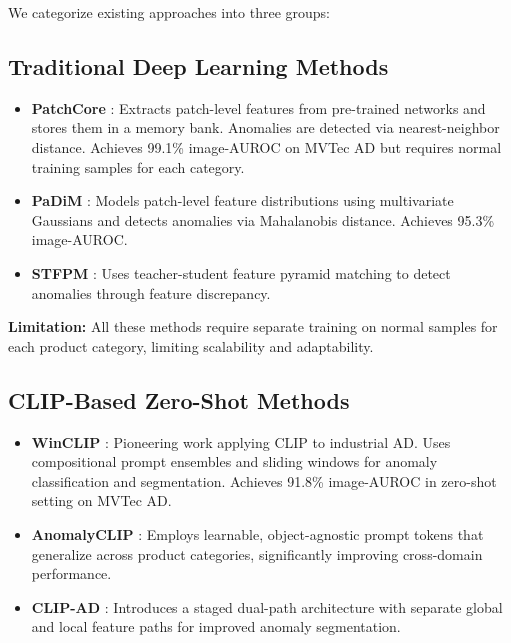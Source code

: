 \documentclass[12pt, a4paper]{article}
\begin{document}
We categorize existing approaches into three groups:

\subsection{Traditional Deep Learning Methods}

\begin{itemize}[leftmargin=*]
    \item \textbf{PatchCore} \cite{roth2022patchcore}: Extracts patch-level features from pre-trained networks and stores them in a memory bank. Anomalies are detected via nearest-neighbor distance. Achieves 99.1\% image-AUROC on MVTec AD but requires normal training samples for each category.
    
    \item \textbf{PaDiM} \cite{defard2020padim}: Models patch-level feature distributions using multivariate Gaussians and detects anomalies via Mahalanobis distance. Achieves 95.3\% image-AUROC.
    
    \item \textbf{STFPM} \cite{wang2021stfpm}: Uses teacher-student feature pyramid matching to detect anomalies through feature discrepancy.
\end{itemize}

\textbf{Limitation:} All these methods require separate training on normal samples for each product category, limiting scalability and adaptability.

\subsection{CLIP-Based Zero-Shot Methods}

\begin{itemize}[leftmargin=*]
    \item \textbf{WinCLIP} \cite{jeong2023winclip}: Pioneering work applying CLIP to industrial AD. Uses compositional prompt ensembles and sliding windows for anomaly classification and segmentation. Achieves 91.8\% image-AUROC in zero-shot setting on MVTec AD.
    
    \item \textbf{AnomalyCLIP} \cite{zhou2024anomalyclip}: Employs learnable, object-agnostic prompt tokens that generalize across product categories, significantly improving cross-domain performance.
    
    \item \textbf{CLIP-AD} \cite{chen2023clipad}: Introduces a staged dual-path architecture with separate global and local feature paths for improved anomaly segmentation.
\end{itemize}
\end{document}
